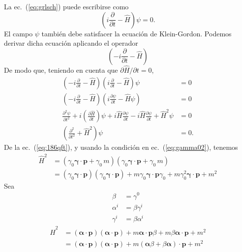 La ec.~(\ref{eq:grlsch}) puede escribirse como
\begin{equation}
  \left(i\frac{\partial}{\partial t}-\hat{H}\right)\psi=0.
\end{equation}
El campo $\psi$ también debe satisfacer la ecuación de Klein-Gordon. Podemos derivar dicha ecuación aplicando el operador
\begin{equation*}
  \left(-i\frac{\partial}{\partial t}-\hat{H}\right)
\end{equation*}
De modo que, teniendo en cuenta que $\partial\hat H/\partial t=0$,
\begin{align}
  \label{eq:105qft}
 \left(-i\frac{\partial}{\partial t}-\hat{H}\right)\left(i\frac{\partial}{\partial t}-\hat{H}\right)\psi&=0\nonumber\\
 \left(-i\frac{\partial}{\partial t}-\hat{H}\right)\left(i\frac{\partial\psi}{\partial t}-\hat{H}\psi\right)&=0\nonumber\\
 \frac{\partial^2\psi}{\partial t^2}+i\left(\frac{\partial\hat{H}}{\partial t}\right)\psi
 +i\hat{H}\frac{\partial\psi}{\partial t}-i\hat{H}\frac{\partial\psi}{\partial t}+\hat{H}^2\psi&=0\nonumber\\
 \left(\frac{\partial^2}{\partial t^2}+\hat{H}^2\right)\psi&=0.
\end{align}
% 
De la ec.~(\ref{eq:186qft}), y usando la condición en ec.~(\ref{eq:gamma02}), tenemos
\begin{align}
\label{eq:106qft}
\hat{H}^2&=(\gamma_0\boldsymbol{\gamma}\cdot\mathbf{p}+\gamma_0\,m)(\gamma_0\boldsymbol{\gamma}\cdot\mathbf{p}+\gamma_0\,m)\nonumber\\
&=(\gamma_0\boldsymbol{\gamma}\cdot\mathbf{p})(\gamma_0\boldsymbol{\gamma}\cdot\mathbf{p})+m\gamma_0\boldsymbol{\gamma}\cdot\mathbf{p}\gamma_0+m\gamma_0^2\boldsymbol{\gamma}\cdot\mathbf{p}+m^2
\end{align}
Sea
\begin{align}
  \beta&=\gamma^0\nonumber\\
  \alpha^i&=\beta\gamma^i\nonumber\\
  \gamma^i&=\beta\alpha^i
\end{align}
\begin{align}
  \hat{H}^2&=(\boldsymbol{\alpha}\cdot\mathbf{p})(\boldsymbol{\alpha}\cdot\mathbf{p})
  +m\boldsymbol{\alpha}\cdot\mathbf{p}\beta+m\beta\boldsymbol{\alpha}\cdot\mathbf{p}+m^2\nonumber\\
  &=(\boldsymbol{\alpha}\cdot\mathbf{p})(\boldsymbol{\alpha}\cdot\mathbf{p})
  +m(\boldsymbol{\alpha}\beta+\beta\boldsymbol{\alpha})\cdot\mathbf{p}+m^2
\end{align}
